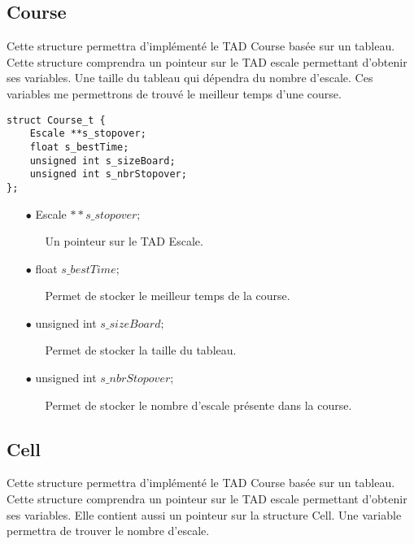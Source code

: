 \documentclass[a4paper, 11pt, oneside]{article}
\begin{document}
	\subsection{Course}
	
		Cette structure permettra d'implémenté le TAD Course basée sur un tableau.
	Cette structure comprendra un pointeur sur le TAD escale permettant d'obtenir ses variables.
	Une taille du tableau qui dépendra du nombre d'escale.
	Ces variables me permettrons de trouvé le meilleur temps d'une course.
		
		\begin{lstlisting}
struct Course_t {
	Escale **s_stopover;
	float s_bestTime;
	unsigned int s_sizeBoard;
	unsigned int s_nbrStopover;
};
		\end{lstlisting}
		
		\begin{itemize}
			\item[$\bullet$] Escale $**s\_stopover;$
			\begin{itemize}
				\item[] Un pointeur sur le TAD Escale.
			\end{itemize}
			\item[$\bullet$] float $s\_bestTime;$
			\begin{itemize}
				\item[] Permet de stocker le meilleur temps de la course.
			\end{itemize}
			\item[$\bullet$] unsigned int $s\_sizeBoard;$
			\begin{itemize}
				\item[] Permet de stocker la taille du tableau.
			\end{itemize}
			\item[$\bullet$] unsigned int $s\_nbrStopover;$
			\begin{itemize}
				\item[] Permet de stocker le nombre d'escale présente dans la course.
			\end{itemize}
		\end{itemize}
		
	\newpage
		
	\subsection{Cell}
	
			Cette structure permettra d'implémenté le TAD Course basée sur un tableau. 
		Cette structure comprendra un pointeur sur le TAD escale permettant d'obtenir ses variables.
		Elle contient aussi un pointeur sur la structure Cell.
		Une variable permettra de trouver le nombre d'escale.	
	
\end{document}
